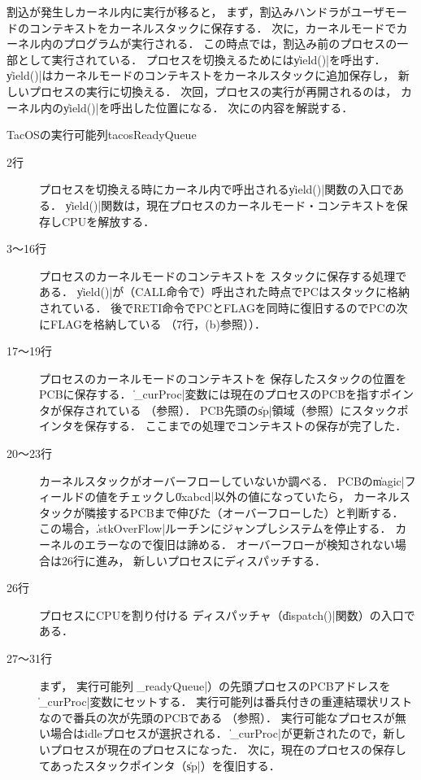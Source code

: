 割込が発生しカーネル内に実行が移ると，
まず，割込みハンドラがユーザモードのコンテキストをカーネルスタックに保存する．
次に，カーネルモードでカーネル内のプログラムが実行される．
この時点では，割込み前のプロセスの一部として実行されている．
プロセスを切換えるためには\|yield()|を呼出す．
\|yield()|はカーネルモードのコンテキストをカーネルスタックに追加保存し，
新しいプロセスの実行に切換える．
次回，プロセスの実行が再開されるのは，
カーネル内の\|yield()|を呼出した位置になる．
次にの内容を解説する．

{TacOSの実行可能列}{tacosReadyQueue}

\begin{description}
\item[2行] プロセスを切換える時にカーネル内で呼出される\|yield()|関数の入口である．
\|yield()|関数は，現在プロセスのカーネルモード・コンテキストを保存しCPUを解放する．

\item[3〜16行] プロセスのカーネルモードのコンテキストを
スタックに保存する処理である．
\|yield()|が（CALL命令で）呼出された時点でPCはスタックに格納されている．
後でRETI命令でPCとFLAGを同時に復旧するのでPCの次にFLAGを格納している
（7行，(b)参照））．

\item[17〜19行] プロセスのカーネルモードのコンテキストを
保存したスタックの位置をPCBに保存する．
\|_curProc|変数には現在のプロセスのPCBを指すポインタが保存されている
（参照）．
PCB先頭の\|sp|領域（参照）にスタックポインタを保存する．
ここまでの処理でコンテキストの保存が完了した．

\item[20〜23行] カーネルスタックがオーバーフローしていないか調べる．
PCBの\|magic|フィールドの値をチェックし\|0xabcd|以外の値になっていたら，
カーネルスタックが隣接するPCBまで伸びた（オーバーフローした）と判断する．
この場合，\|.stkOverFlow|ルーチンにジャンプしシステムを停止する．
カーネルのエラーなので復旧は諦める．
オーバーフローが検知されない場合は26行に進み，
新しいプロセスにディスパッチする．

\item[26行] プロセスにCPUを割り付ける
ディスパッチャ（\|dispatch()|関数）の入口である．

\item[27〜31行] まず，
実行可能列（\|_readyQueue|）の先頭プロセスのPCBアドレスを
\|_curProc|変数にセットする．
実行可能列は番兵付きの重連結環状リストなので番兵の次が先頭のPCBである
（参照）．
実行可能なプロセスが無い場合はidleプロセスが選択される．
\|_curProc|が更新されたので，新しいプロセスが現在のプロセスになった．
次に，現在のプロセスの保存してあったスタックポインタ（\|sp|）を復旧する．


\end{description}
